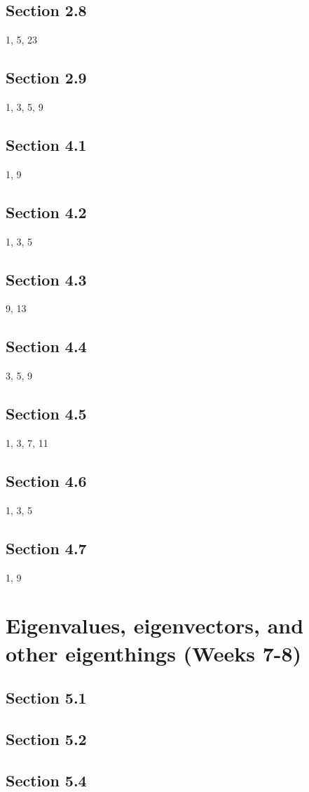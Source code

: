 \documentclass{amsart}
\begin{document}
\subsection*{Section 2.8} 1, 5, 23
\subsection*{Section 2.9} 1, 3, 5, 9
\subsection*{Section 4.1} 1, 9
\subsection*{Section 4.2} 1, 3, 5
\subsection*{Section 4.3} 9, 13
\subsection*{Section 4.4} 3, 5, 9
\subsection*{Section 4.5} 1, 3, 7, 11
\subsection*{Section 4.6} 1, 3, 5
\subsection*{Section 4.7} 1, 9


\section{Eigenvalues, eigenvectors, and other eigenthings (Weeks 7-8)}

\subsection*{Section 5.1}
\subsection*{Section 5.2}
\subsection*{Section 5.4}
\end{document}
